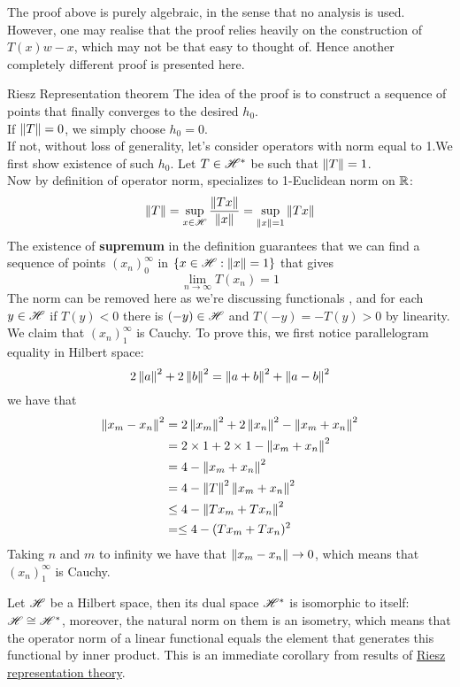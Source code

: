 \begin{remark}\rm\nextline
	The proof above is purely algebraic, in the sense that no analysis is used. However, one may realise that the proof relies heavily on the construction of $T(x)w-x$, which may not be that easy to thought of. Hence another completely different proof is presented here. 
	\begin{pf}{Riesz Representation theorem}{}
	The idea of the proof is to construct a sequence of points that finally converges to the desired $h_0$.\\
	If $\left\|{T}\right\|=0$, we simply choose $h_0=0$.\\
	If not, without loss of generality, let's consider operators with norm equal to 1.We first show existence of such $h_0$. Let $T\in\mathscr{H}^*$ be such that $\left\|{T}\right\|=1$.\\
	Now by definition of operator norm, specializes to 1-Euclidean norm on $\mathbb{R}$:
	$$
		\left\|{T}\right\|=\sup_{x\in\mathscr{H}}\frac{\left\|{Tx}\right\|}{\left\|{x}\right\|} =\sup_{\left\|{x}\right\|=1}\left\|{Tx}\right\|
	$$
	The existence of {\bf supremum} in the definition guarantees that we can find a sequence of points $(x_n)_0^\infty$ in $\{x\in\mathscr{H}:\left\|{x}\right\|=1\}$ that gives
	$$
		\lim_{n\to\infty}{T(x_n)}=1
	$$
	The norm can be removed here as we're discussing functionals , and for each $y\in\mathscr{H}$ if $T(y)<0$ there is $(-y)\in\mathscr{H}$ and $T(-y)=-T(y)>0$ by linearity.\\
	We claim that $(x_n)_1^\infty$ is Cauchy. To prove this, we first notice  parallelogram equality in Hilbert space:
	$$
		2\left\|{a}\right\|^2+2\left\|{b}\right\|^2=\left\|{a+b}\right\|^2+\left\|{a-b}\right\|^2
	$$
	we have that
	\begin{equation}
		\begin{split}
			\left\|{x_m-x_n}\right\|^2&=2\left\|{x_m}\right\|^2+2\left\|{x_n}\right\|^2-\left\|{x_m+x_n}\right\|^2\\
			&=2\times1+2\times1-\left\|{x_m+x_n}\right\|^2\\
			&=4-\left\|{x_m+x_n}\right\|^2\\
			&=4-\left\|{T}\right\|^2\left\|{x_m+x_n}\right\|^2\\
			&\leq4-\left\|{Tx_m+Tx_n}\right\|^2\\
			&=\leq4-(Tx_m+Tx_n)^2
		\end{split}
	\end{equation}
	Taking $n$ and $m$ to infinity we have that $\left\|{x_m-x_n}\right\|\to 0$, which means that $(x_n)_1^\infty$ is Cauchy.
	\end{pf}
\end{remark}
\begin{theorem}\label{dual space Hilbert}\rm\nextline
	Let $\mathscr{H}$ be a Hilbert space, then its dual space $\mathscr{H}^*$ is isomorphic to  itself: $\mathscr{H}\cong\mathscr{H}^*$, moreover, the natural norm on them is an isometry, which means that the operator norm of a linear functional equals the element that generates this functional by inner product. This is an immediate corollary from results of \hyperref[Riesz representation theory]{Riesz representation theory}.
\end{theorem}

